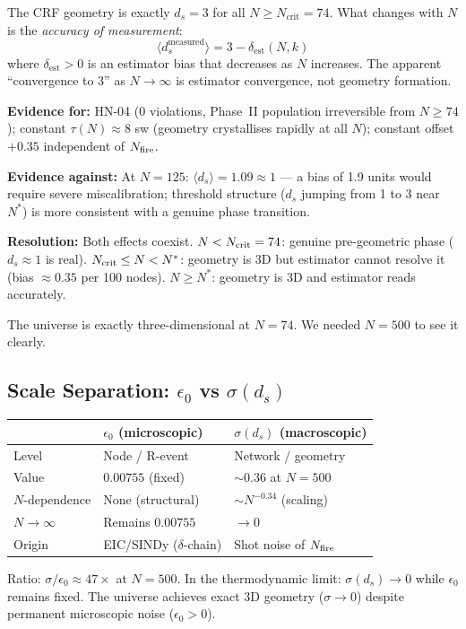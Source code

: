 \documentclass[12pt, a4paper]{article}
\begin{document}
\begin{formalbox}[title={Estimator Convergence Hypothesis (Explains Threshold)}]
The CRF geometry is exactly $d_s=3$ for all $N\geq N_{\mathrm{crit}}=74$.
What changes with $N$ is the \emph{accuracy of measurement}:
\[
  \langle d_s^{\mathrm{measured}}\rangle = 3 - \delta_{\mathrm{est}}(N,k)
\]
where $\delta_{\mathrm{est}}>0$ is an estimator bias that decreases as $N$ increases.
The apparent ``convergence to 3'' as $N\to\infty$ is estimator convergence, not geometry formation.

\textbf{Evidence for:} HN-04 (0 violations, Phase~II population irreversible from $N\geq 74$);
constant $\tau(N)\approx 8$ sw (geometry crystallises rapidly at all $N$);
constant offset $+0.35$ independent of $N_{\rm fire}$.

\textbf{Evidence against:} At $N=125$: $\langle d_s\rangle=1.09\approx 1$ --- a bias of 1.9 units would require severe miscalibration; threshold structure ($d_s$ jumping from 1 to 3 near $N^*$) is more consistent with a genuine phase transition.

\textbf{Resolution:} Both effects coexist.
$N<N_{\rm crit}=74$: genuine pre-geometric phase ($d_s\approx 1$ is real).
$N_{\rm crit}\leq N<N^*$: geometry is 3D but estimator cannot resolve it (bias $\approx 0.35$ per 100 nodes).
$N\geq N^*$: geometry is 3D and estimator reads accurately.

The universe is exactly three-dimensional at $N=74$. We needed $N=500$ to see it clearly.
\end{formalbox}

\subsection{Scale Separation: $\epsilon_0$ vs $\sigma(d_s)$}

\begin{derivedbox}[title={Scale Separation Confirmed ($47\times$)}]
\begin{center}
\renewcommand{\arraystretch}{1.5}
\begin{tabular}{lll}
\toprule
 & $\epsilon_0$ (microscopic) & $\sigma(d_s)$ (macroscopic)\\
\midrule
Level & Node / R-event & Network / geometry\\
Value & $0.00755$ (fixed) & $\sim 0.36$ at $N=500$\\
$N$-dependence & None (structural) & $\sim N^{-0.34}$ (scaling)\\
$N\to\infty$ & Remains $0.00755$ & $\to 0$\\
Origin & EIC/SINDy ($\delta$-chain) & Shot noise of $N_{\rm fire}$\\
\bottomrule
\end{tabular}
\end{center}
Ratio: $\sigma/\epsilon_0\approx 47\times$ at $N=500$.
In the thermodynamic limit: $\sigma(d_s)\to 0$ while $\epsilon_0$ remains fixed.
The universe achieves exact 3D geometry ($\sigma\to 0$) despite permanent microscopic noise ($\epsilon_0>0$).
\end{derivedbox}
\end{document}
